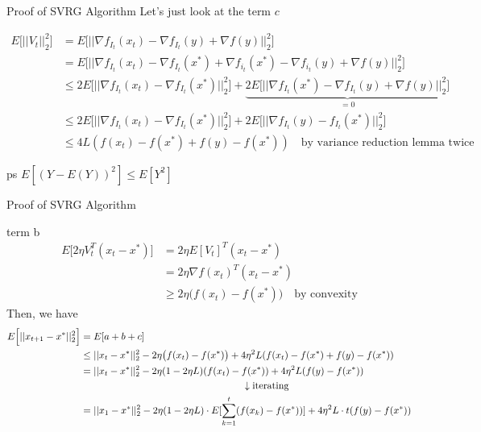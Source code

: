 \documentclass[aspectratio=169,xcolor=dvipsnames]{beamer}
\begin{document}
\begin{frame}{Proof of SVRG Algorithm}
Let's just look at the term $c$

\begin{align*}
	E\Big[\big|\big|V_t\big|\big|_2^2\Big] &= E\Big[ \big|\big|\nabla f_{I_t}(x_t) - \nabla f_{I_t}(y) + \nabla f(y)\big|\big|_2^2\Big] \\
	&= E\Big[ \big|\big|\nabla f_{I_t}(x_t) - \nabla f_{I_t}(x^*) + \nabla f_{i_t}(x^*) - \nabla f_{i_t}(y) + \nabla f(y)\big|\big|_2^2\Big]\\
	& \le 2E\Big[\big|\big| \nabla f_{I_t}(x_t) - \nabla f_{I_t}(x^*)  \big|\big|_2^2\Big] + \underbrace{2E\Big[\big|\big| \nabla f_{I_t}(x^*) - \nabla f_{I_t}(y) + \nabla f(y) \big|\big|_2^2\Big]}_{=0}\\
	& \le 2E\Big[\big|\big| \nabla f_{I_t}(x_t) - \nabla f_{I_t}(x^*)  \big|\big|_2^2\Big] + 2E\Big[\big|\big|   \nabla f_{I_t}(y) - f_{I_t}(x^*)   \big|\big|_2^2\Big]\\
	& \le 4L(f(x_t) - f(x^*) + f(y) - f(x^*) ) \quad \text{by variance reduction lemma twice}
\end{align*}

\pause ps $E[(Y - E(Y))^2] \le E[Y^2]$

\end{frame}



\begin{frame}{Proof of SVRG Algorithm}

term b
\begin{align*}
	E\Big[2\eta V_t^T(x_t - x^*)\Big] &= 2\eta E[V_t]^T(x_t - x^*)\\
	& = 2\eta \nabla f(x_t)^T(x_t - x^*)\\
	& \ge 2\eta \big( f(x_t) - f(x^*) \big) \quad \text{by convexity}
\end{align*}
Then, we have
\begin{align*}
	E\Big[ || x_{t+1} - x^* ||_2^2 \Big] &= E[a + b + c]\\
	& \le ||x_t - x^* ||_2^2 - 2\eta \big( f(x_t) - f(x^*) \big) + 4\eta^2 L(f(x_t) - f(x^*) + f(y) - f(x^*) ) \\
	& = ||x_t - x^* ||_2^2 - 2\eta(1 - 2\eta L)(f(x_t) - f(x^*)) + 4\eta^2L(f(y) - f(x^*))\\
	& \hspace{58mm} \downarrow \text{iterating}\\
	& = ||x_1 - x^*||_2^2 - 2\eta(1-2\eta L)\cdot E[\sum_{k=1}^t (f(x_k) - f(x^*)) ] + 4\eta^2L\cdot t(f(y) - f(x^*))
\end{align*}

\end{frame}
\end{document}
